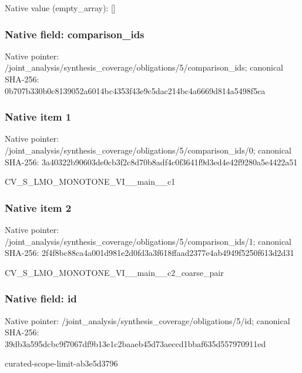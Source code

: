 \documentclass[10pt,a4paper]{article}
\begin{document}
Native value (empty\_\allowbreak{}array): []

\subsubsection{Native field: comparison\_\allowbreak{}ids}
Native pointer: /joint\_\allowbreak{}analysis/synthesis\_\allowbreak{}coverage/obligations/5/comparison\_\allowbreak{}ids; canonical SHA-256: 0b707b330b0c8139052a6014bc4353f43e9c5dac214bc4a6669d814a5498f5ca

\subsubsection{Native item 1}
Native pointer: /joint\_\allowbreak{}analysis/synthesis\_\allowbreak{}coverage/obligations/5/comparison\_\allowbreak{}ids/0; canonical SHA-256: 3a40322b90603de0cb3f2c8d70b8adf4c0f3641f9d3ed4e42f9280a5e4422a51

\begingroup\raggedright\sloppy CV\_\allowbreak{}S\_\allowbreak{}LMO\_\allowbreak{}MONOTONE\_\allowbreak{}VI\_\allowbreak{}\_\allowbreak{}main\_\allowbreak{}\_\allowbreak{}c1\par\endgroup

\subsubsection{Native item 2}
Native pointer: /joint\_\allowbreak{}analysis/synthesis\_\allowbreak{}coverage/obligations/5/comparison\_\allowbreak{}ids/1; canonical SHA-256: 2f4f8bc88ca4a001d981e2d0fd3a3f618ffaad2377e4ab4949f5250f613d2d31

\begingroup\raggedright\sloppy CV\_\allowbreak{}S\_\allowbreak{}LMO\_\allowbreak{}MONOTONE\_\allowbreak{}VI\_\allowbreak{}\_\allowbreak{}main\_\allowbreak{}\_\allowbreak{}c2\_\allowbreak{}coarse\_\allowbreak{}pair\par\endgroup

\subsubsection{Native field: id}
Native pointer: /joint\_\allowbreak{}analysis/synthesis\_\allowbreak{}coverage/obligations/5/id; canonical SHA-256: 39db3a595dcbc9f7067df9b13e1c2baaeb45d73aeccd1bbaf635d557970911ed

\begingroup\raggedright\sloppy curated-scope-limit-ab3e5d3796\par\endgroup
\end{document}

